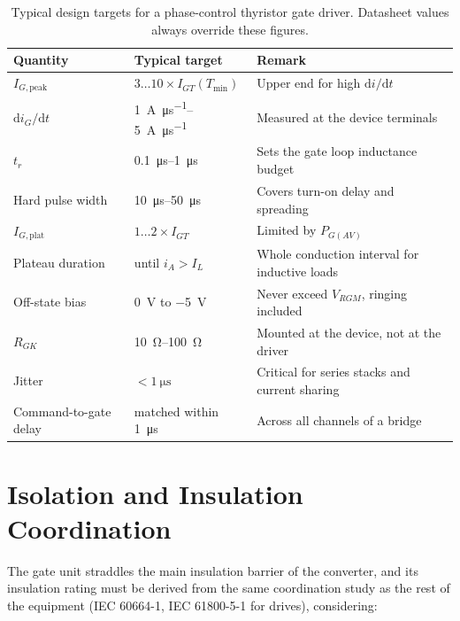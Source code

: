 \begin{table}[htbp]
\centering
\caption{Typical design targets for a phase-control thyristor gate driver.
Datasheet values always override these figures.}
\label{thygate:tab:targets}
\begin{tabular}{@{}llp{6.4cm}@{}}
\toprule
\textbf{Quantity} & \textbf{Typical target} & \textbf{Remark} \\
\midrule
$I_{G,\text{peak}}$ & $3\dots10\times I_{GT}(T_{\min})$ &
  Upper end for high $\mathrm{d}i/\mathrm{d}t$ \\
$\mathrm{d}i_G/\mathrm{d}t$ & \SIrange{1}{5}{\ampere\per\micro\second} &
  Measured at the device terminals \\
$t_r$ & \SIrange{0.1}{1}{\micro\second} & Sets the gate loop inductance budget \\
Hard pulse width & \SIrange{10}{50}{\micro\second} & Covers turn-on delay and spreading \\
$I_{G,\text{plat}}$ & $1\dots2\times I_{GT}$ & Limited by $P_{G(AV)}$ \\
Plateau duration & until $i_A > I_L$ &
  Whole conduction interval for inductive loads \\
Off-state bias & \SI{0}{\volt} to \SI{-5}{\volt} &
  Never exceed $V_{RGM}$, ringing included \\
$R_{GK}$ & \SIrange{10}{100}{\ohm} & Mounted at the device, not at the driver \\
Jitter & $< \SI{1}{\micro\second}$ &
  Critical for series stacks and current sharing \\
Command-to-gate delay & matched within \SI{1}{\micro\second} &
  Across all channels of a bridge \\
\bottomrule
\end{tabular}
\end{table}

\section{Isolation and Insulation Coordination}

The gate unit straddles the main insulation barrier of the converter, and its
insulation rating must be derived from the same coordination study as the rest of
the equipment (IEC 60664-1, IEC 61800-5-1 for drives), considering:

